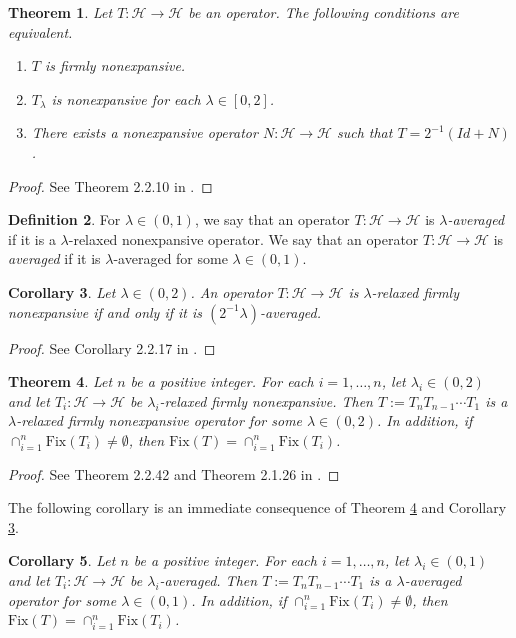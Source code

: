 \documentclass[]{interact}
\theoremstyle{plain}%
\newtheorem{theorem}{Theorem}[section]
\newtheorem{corollary}[theorem]{Corollary}
\theoremstyle{definition}
\newtheorem{definition}[theorem]{Definition}
\theoremstyle{remark}
\begin{document}
\begin{theorem}
\label{FNE-equiv.cond}Let $T:\mathcal{H}\rightarrow\mathcal{H}$
be an operator. The following conditions are equivalent.
\begin{enumerate}
\item $T$ is firmly nonexpansive.
\item $T_{\lambda}$ is nonexpansive for each $\lambda\in\left[0,2\right]$.
\item There exists a nonexpansive operator $N:\mathcal{H\rightarrow\mathcal{H}}$
such that $T=2^{-1}\left(Id+N\right)$.
\end{enumerate}
\end{theorem}
\begin{proof}
See Theorem 2.2.10 in \cite{key-11}.
\end{proof}
\begin{definition}
For $\lambda\in\left(0,1\right)$, we say that an operator $T:\mathcal{H}\rightarrow\mathcal{H}$
is \textit{$\lambda$-averaged }if it is a $\lambda$-relaxed nonexpansive
operator. We say that an operator $T:\mathcal{H}\rightarrow\mathcal{H}$
is \textit{averaged }if it is $\lambda$-averaged for some $\lambda\in\left(0,1\right)$.
\end{definition}
\begin{corollary}
\label{2.2.17}Let $\lambda\in\left(0,2\right)$. An operator $T:\mathcal{H}\rightarrow\mathcal{H}$
is $\lambda$-relaxed firmly nonexpansive if and only if it is $(2^{-1}\lambda)$-averaged.
\end{corollary}
\begin{proof}
See Corollary 2.2.17 in \cite{key-11}.
\end{proof}
\begin{theorem}
\label{thm:2.2.42}Let $n$ be a positive integer. For each $i=1,\dots,n$,
let $\lambda_{i}\in\left(0,2\right)$ and let $T_{i}:\mathcal{H}\rightarrow\mathcal{H}$
be $\lambda_{i}$-relaxed firmly nonexpansive. Then $T:=T_{n}T_{n-1}\cdots T_{1}$
is a $\lambda$-relaxed firmly nonexpansive operator for some $\lambda\in\left(0,2\right)$.
In addition, if $\cap_{i=1}^{n}\mathrm{Fix}(T_{i})\not=\emptyset$,
then $\mathrm{Fix}(T)=\cap_{i=1}^{n}\mathrm{Fix}(T_{i})$.
\end{theorem}
\begin{proof}
See Theorem 2.2.42 and Theorem 2.1.26 in \cite{key-11}.
\end{proof}
The following corollary is an immediate consequence of Theorem \ref{thm:2.2.42}
and Corollary \ref{2.2.17}.
\begin{corollary}
\label{compos.averaged}Let $n$ be a positive integer. For each $i=1,\dots,n$,
let $\lambda_{i}\in\left(0,1\right)$ and let $T_{i}:\mathcal{H}\rightarrow\mathcal{H}$
be $\lambda_{i}$-averaged. Then $T:=T_{n}T_{n-1}\cdots T_{1}$ is
a $\lambda$-averaged operator for some $\lambda\in\left(0,1\right)$.
In addition, if $\cap_{i=1}^{n}\mathrm{Fix}(T_{i})\not=\emptyset$,
then $\mathrm{Fix}(T)=\cap_{i=1}^{n}\mathrm{Fix}(T_{i})$.
\end{corollary}
\end{document}
